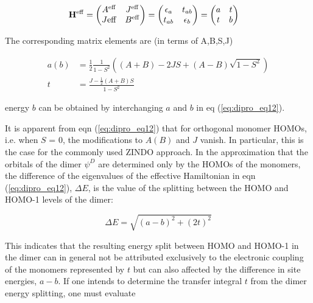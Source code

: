 \begin{equation}
 \begin{aligned}
  \mathbf{ H }^{\mathrm{eff}} &= 
    \begin{pmatrix}
      A^{\mathrm{eff}}    &  J^\mathrm{eff} \\
      J\mathrm{eff}       &  B^\mathrm{eff}  
    \end{pmatrix} =
    \begin{pmatrix}
      \epsilon_a    &  t_{ab} \\
      t_{ab}       &  \epsilon_b  
    \end{pmatrix} =
    \begin{pmatrix}
      a    &  t \\
      t    &  b  
    \end{pmatrix}
 \end{aligned}
  \label{eq:dipro_eq11}
\end{equation}

The corresponding matrix elements are (in terms of A,B,S,J)

\begin{equation}
 \begin{aligned}
  a(b) &= \frac{1}{2}
    \frac{1}{1 - S^2} 
    ( (A + B) - 2 J S + 
    (A - B) \sqrt{1 - S^2} ) \\
  t &= \frac{J - \frac{1}{2}(A+B)S}{1-S^2}
 \end{aligned}
 \label{eq:dipro_eq12}
\end{equation}
 
energy $b$ can be obtained by interchanging $a$ and $b$ in eq 
(\ref{eq:dipro_eq12}).

It is apparent from eqn (\ref{eq:dipro_eq12}) that for orthogonal monomer
HOMOs, i.e. when $S$ = 0, the modifications to $A(B)$ and
$J$ vanish. In particular, this is the case for the commonly
used ZINDO approach. In the approximation that the orbitals
of the dimer $\psi^D$ are determined only by the HOMOs of
the monomers, the difference of the eigenvalues of the
effective Hamiltonian in eqn (\ref{eq:dipro_eq12}), 
$\Delta E$, is the value of the
splitting between the HOMO and HOMO-1 levels of
the dimer:

\begin{equation}
  \Delta E = 
  \sqrt{ (a - b)^2 + (2t)^2 }
   \label{eq:dipro_eq13}
\end{equation}

This indicates that the resulting energy split between HOMO
and HOMO-1 in the dimer can in general not be attributed
exclusively to the electronic coupling of the monomers
represented by $t$ but can also affected by the difference
in site energies, $a-b$. If one intends to determine the
transfer integral $t$ from the dimer energy splitting, one must
evaluate

